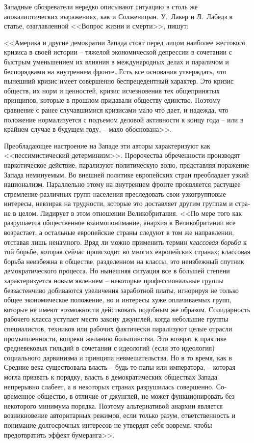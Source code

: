 \documentclass{book}
\begin{document}
Западные обозреватели нередко описывают ситуацию в столь же апокалиптических выражениях, как и Солженицын. У.~Лакер и Л.~Лабедз в статье, озаглавленной <<Вопрос жизни и смерти>>, пишут:

<<Америка и другие демократии Запада стоят перед лицом наиболее жестокого кризиса в своей истории -- тяжелой эконо­мической депрессии в сочетании с быстрым уменьшением их влияния в международных делах и параличом и беспорядками на внутреннем фронте\ldots Есть все основания утверждать, что нынешний кризис имеет совершенно беспрецедентный харак­тер. Это кризис обществ, их норм и ценностей, кризис исчез­новения тех общепринятых принципов, которые в прошлом придавали обществу единство. Поэтому сравнение с ранее слу­чавшимися кризисами мало что дает, и надежда, что положе­ние нормализуется с подъемом деловой активности к концу года -- или в крайнем случае в будущем году, -- мало обосно­вана>>.%

Преобладающее настроение на Западе эти авторы характе­ризуют как <<пессимистический детерминизм>>. Пророчества обреченности производят наркотическое действие, парализуют политическую волю, представляя поражение Запада немину­емым. Во внешней политике европейских стран преобладает узкий национализм. Параллельно этому на внутреннем фрон­те проявляется растущее стремление различных групп населе­ния преследовать свои узкогрупповые интересы, невзирая на трудности, которые это доставляет другим группам и стра­не в целом. Лидирует в этом отношении Великобритания. <<По мере того как разрушается общественное взаимопонимание, анархия в Великобритании все возрастает, а остальные евро­пейские страны следуют в том же направлении, отставая лишь ненамного. Вряд ли можно применить термин \textit{классовая борьба} к  той борьбе, которая сейчас происходит во многих евро­пейских странах; классовая борьба неизбежна в обществе, раз­деленном на классы, это неизбежный спутник демократиче­ского процесса. Но нынешняя ситуация все в большей 
степени характеризуется новым явлением -- некоторые професси­ональные группы беззастенчиво добиваются увеличения зара­ботной платы, игнорируя не только общее экономическое положение, но и интересы хуже оплачиваемых групп, которые не имеют возможности действовать подобным же образом. Солидарность рабочего класса уступает место закону джунг­лей, когда небольшие группы специалистов, техников или ра­бочих фактически парализуют целые отрасли промышленно­сти, вопреки желанию большинства. Это возврат к практике средневековых гильдий в сочетании с идеологий (если это идеология) социального дарвинизма и принципа невмешатель­ства. Но в то время, как в Средние века существовала власть -- будь то папы или императора, -- которая могла призвать к поряд­ку, власть в демократических обществах Запада непрерывно слабеет, а в некоторых странах разрушилась совершенно. Со­временное общество, в отличие от джунглей, не может функ­ционировать без некоторого минимума порядка. Поэтому альтернативой анархии является возникновение 
авторитарных режимов, если только разум, ответственность и понимание долгосрочных интересов не утвердят себя вовремя, чтобы предотвратить эффект бумеранга>>.%
\end{document}
